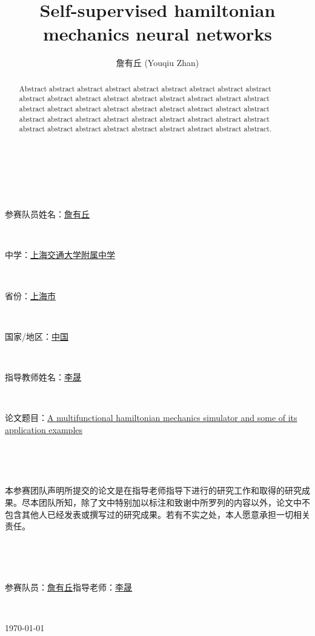 \documentclass{article}
\title{Self-supervised hamiltonian mechanics neural networks}
\author{詹有丘 (Youqiu Zhan)}
\begin{document}
\Huge

~\par
~\par
\noindent 参赛队员姓名：\underline{詹有丘}\par
~\par
\noindent 中学：\underline{上海交通大学附属中学}\par
~\par
\noindent 省份：\underline{上海市}\par
~\par
\noindent 国家/地区：\underline{中国}\par
~\par
\noindent 指导教师姓名：\underline{李晟}\par
~\par
\noindent 论文题目：\ul{A multifunctional hamiltonian mechanics simulator and some of its application examples}

\newpage

\huge

~\par
~\par
\setlength{\parindent}{5ex}
本参赛团队声明所提交的论文是在指导老师指导下进行的研究工作和取得的研究成果。尽本团队所知，除了文中特别加以标注和致谢中所罗列的内容以外，论文中不包含其他人已经发表或撰写过的研究成果。若有不实之处，本人愿意承担一切相关责任。\par
~\par
~\par
参赛队员：\underline{詹有丘}\qquad 指导老师：\underline{李晟}\par
~\par
\begin{flushright}\chinesedate\today\end{flushright}

\normalsize

\setlength{\parindent}{1.5em}

\maketitle

\begin{abstract}
Abstract abstract abstract abstract abstract abstract abstract abstract abstract abstract abstract abstract abstract abstract abstract abstract abstract abstract abstract abstract abstract abstract abstract abstract abstract abstract abstract abstract abstract abstract abstract abstract abstract abstract abstract abstract abstract abstract abstract abstract abstract abstract abstract abstract abstract.
\end{abstract}
\end{document}
